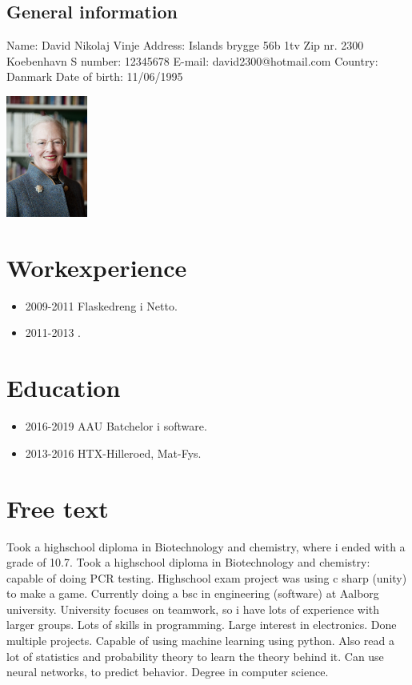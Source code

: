 \begin{center}
 \begin{minipage}[b]{0.45\textwidth} 
\subsection*{General information}
Name: David Nikolaj Vinje 
Address: Islands brygge 56b 1tv
Zip nr. 2300 Koebenhavn S
number: 12345678
E-mail: david2300@hotmail.com
Country: Danmark
Date of birth: 11/06/1995
\newline \end{minipage}
 \hfill
\begin{minipage}[b]{3cm}
 \includegraphics[height=4cm]{figures/1200px-Drottning_Margrethe_av_Danmark}
 \end{minipage}
 \end{center}

\section*{Workexperience}
\begin{itemize}
\item 2009-2011 Flaskedreng i Netto.
\item 2011-2013 .
\end{itemize}
\section*{Education}
\begin{itemize}
\item 2016-2019 AAU Batchelor i software.
\item 2013-2016 HTX-Hilleroed, Mat-Fys.
\end{itemize}

\section*{Free text}
Took a highschool diploma in Biotechnology and chemistry, where i ended with a grade of 10.7.
Took a highschool diploma in Biotechnology and chemistry: capable of doing PCR testing.
Highschool exam project was using c sharp (unity) to make a game.
Currently doing a bsc in engineering (software) at Aalborg university.
University focuses on teamwork, so i have lots of experience with larger groups.
Lots of skills in programming.
Large interest in electronics. Done multiple projects.
Capable of using machine learning using python. Also read a lot of statistics and probability theory to learn the theory behind it. Can use neural networks, to predict behavior.
Degree in computer science.

